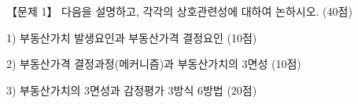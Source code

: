 \begin{longquestion}{【문제 1】}
다음을 설명하고, 각각의 상호관련성에 대하여 논하시오. (40점) \par
1) 부동산가치 발생요인과 부동산가격 결정요인 (10점) \par
2) 부동산가격 결정과정(메커니즘)과 부동산가치의 3면성 (10점) \par
3) 부동산가치의 3면성과 감정평가 3방식 6방법 (20점) \par
\end{longquestion}
